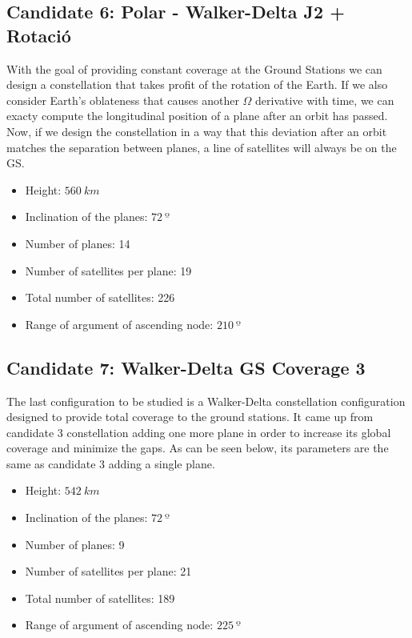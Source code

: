 \subsection{Candidate 6: Polar - Walker-Delta J2 + Rotació}

With the goal of providing constant coverage at the Ground Stations we can design a constellation that takes profit of the rotation of the Earth. If we also consider Earth's oblateness that causes another $\Omega$ derivative with time, we can exacty compute the longitudinal position of a plane after an orbit has passed. Now, if we design the constellation in a way that this deviation after an orbit matches the separation between planes, a line of satellites will always be on the GS.

\begin{itemize}
\item Height: $560~{km}$ 
\item Inclination of the planes: $72~{º}$  
\item Number of planes: 14
\item Number of satellites per plane: 19
\item Total number of satellites: 226
\item Range of argument of ascending node: $210~{º}$
\end{itemize}

\subsection{Candidate 7: Walker-Delta GS Coverage 3}

The last configuration to be studied is a Walker-Delta constellation configuration designed to provide total coverage to the ground stations. It came up from candidate 3 constellation adding one more plane in order to increase its global coverage and minimize the gaps. As can be seen below, its parameters are the same as candidate 3 adding a single plane.

\begin{itemize}
\item Height: $542~{km}$ 
\item Inclination of the planes: $72~{º}$  
\item Number of planes: 9
\item Number of satellites per plane: 21
\item Total number of satellites: 189
\item Range of argument of ascending node: $225~{º}$
\end{itemize}

